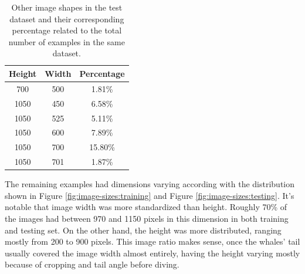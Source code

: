 \documentclass[12pt,
    brazil,			%
	english,        %
	]{article}
\begin{document}
\begin{table}[htb]
    \centering
    \setlength{\tabcolsep}{25pt} %
    \renewcommand{\arraystretch}{1.5} %
    \begin{tabular}{ccc}
        \hline \hline
        Height & Width & Percentage \\
        \hline
            700     &   500 &   1.81\% \\
            1050    &   450 &   6.58\% \\
            1050    &   525 &   5.11\% \\
            1050    &   600 &   7.89\% \\
            1050    &   700 &   15.80\% \\
            1050    &   701 &   1.87\% \\
        \hline \hline
    \end{tabular}
    \caption{Other image shapes in the test dataset and their corresponding percentage related to the total number of examples in the same dataset.}
    \label{tab:image-sizes:testing}
\end{table}

The remaining examples had dimensions varying according with the distribution shown in Figure \ref{fig:image-sizes:training} and Figure \ref{fig:image-sizes:testing}. It's notable that image width was more standardized than height. Roughly 70\% of the images had between 970 and 1150 pixels in this dimension in both training and testing set. On the other hand, the height was more distributed, ranging mostly from  200 to 900 pixels. This image ratio makes sense, once the whales' tail usually covered the image width almost entirely, having the height varying mostly because of cropping and tail angle before diving.
\end{document}
